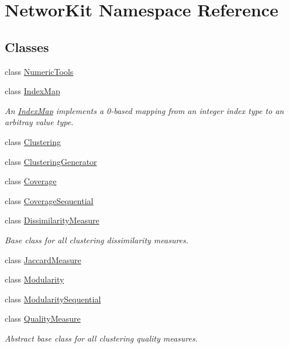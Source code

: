 \hypertarget{namespace_networ_kit}{\section{Networ\-Kit Namespace Reference}
\label{namespace_networ_kit}
}
\subsection*{Classes}
\begin{DoxyCompactItemize}
\item 
class \hyperlink{class_networ_kit_1_1_numeric_tools}{Numeric\-Tools}
\item 
class \hyperlink{class_networ_kit_1_1_index_map}{Index\-Map}
\begin{DoxyCompactList}\small\item\em An \hyperlink{class_networ_kit_1_1_index_map}{Index\-Map} implements a 0-\/based mapping from an integer index type to an arbitray value type. \end{DoxyCompactList}\item 
class \hyperlink{class_networ_kit_1_1_clustering}{Clustering}
\item 
class \hyperlink{class_networ_kit_1_1_clustering_generator}{Clustering\-Generator}
\item 
class \hyperlink{class_networ_kit_1_1_coverage}{Coverage}
\item 
class \hyperlink{class_networ_kit_1_1_coverage_sequential}{Coverage\-Sequential}
\item 
class \hyperlink{class_networ_kit_1_1_dissimilarity_measure}{Dissimilarity\-Measure}
\begin{DoxyCompactList}\small\item\em Base class for all clustering dissimilarity measures. \end{DoxyCompactList}\item 
class \hyperlink{class_networ_kit_1_1_jaccard_measure}{Jaccard\-Measure}
\item 
class \hyperlink{class_networ_kit_1_1_modularity}{Modularity}
\item 
class \hyperlink{class_networ_kit_1_1_modularity_sequential}{Modularity\-Sequential}
\item 
class \hyperlink{class_networ_kit_1_1_quality_measure}{Quality\-Measure}
\begin{DoxyCompactList}\small\item\em Abstract base class for all clustering quality measures. \end{DoxyCompactList}\item 

\end{DoxyCompactItemize}
